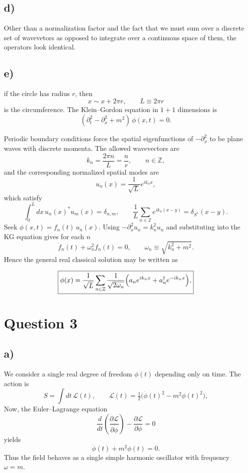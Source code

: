 \documentclass[12pt]{article}
\begin{document}
\subsection*{d)}
Other than a normalization factor and the fact that we must sum over a 
discrete set of wavevetors as opposed to integrate over a continuous
space of them, the operators look identical.

\subsection*{e)}
if the circle has radius \(r\), then
\[
x \sim x + 2\pi r,\qquad L\equiv 2\pi r
\]
is the circumference. The Klein--Gordon equation in \(1+1\) dimensions is
\[
(\partial_t^2-\partial_x^2 + m^2)\,\phi(x,t)=0.
\]

Periodic boundary conditions force the spatial eigenfunctions of \(-\partial_x^2\)
to be plane waves with discrete momenta. The allowed wavevectors are
\[
k_n=\frac{2\pi n}{L}=\frac{n}{r},\qquad n\in\mathbb Z,
\]
and the corresponding normalized spatial modes are
\[
u_n(x)=\frac{1}{\sqrt{L}}e^{i k_n x},
\]
which satisfy
\[
\int_0^L dx\, u_n(x)^* u_m(x)=\delta_{n,m},\qquad
\frac{1}{L}\sum_{n\in\mathbb Z} e^{i k_n(x-y)}=\delta_{S^1}(x-y).
\]
Seek \(\phi(x,t)=f_n(t)\,u_n(x)\). Using \(-\partial_x^2 u_n = k_n^2 u_n\) and
substituting into the KG equation gives for each \(n\)
\[
\ddot f_n(t) + \omega_n^2 f_n(t)=0,\qquad
\omega_n\equiv\sqrt{k_n^2+m^2}.
\]
Hence the general real classical solution may be written as

\[
\boxed{%
\phi(x)=\frac{1}{\sqrt{L}}\sum_{n\in\mathbb Z}\frac{1}{\sqrt{2\omega_n}}
\Big( a_n e^{i k_n x} + a_n^\dagger e^{-i k_n x} \Big),
}
\]

\section*{Question 3}
\subsection*{a)}

We consider a single real degree of freedom \(\phi(t)\) depending only on time.
The action is
\[
S=\int dt\,\mathcal{L}(t),\qquad
\mathcal{L}(t)=\tfrac12\big(\dot\phi(t)^2 - m^2\phi(t)^2\big),
\]
Now, the Euler--Lagrange equation
\[
\frac{d}{dt}\!\left(\frac{\partial\mathcal{L}}{\partial\dot\phi}\right)
- \frac{\partial\mathcal{L}}{\partial\phi}=0
\]
yields
\[
\ddot\phi(t) + m^2\phi(t)=0.
\]
Thus the field behaves as a single simple harmonic oscillator with
frequency \(\omega=m\).
\end{document}
